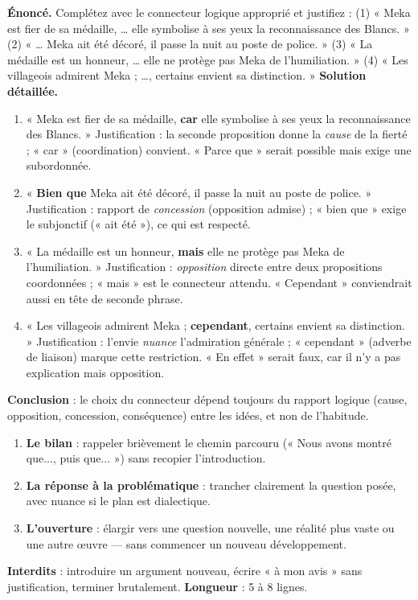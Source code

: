 \documentclass[11pt]{article}
\newcounter{popsec}
\newcounter{popsub}
\newcommand{\courssub}[1]{%
  \stepcounter{popsub}%
  \par\vspace{9pt}\noindent{\popxbold\fontsize{11.5}{13}\selectfont\color{popink}{\color{poporange}\thepopsec.\thepopsub}\hspace{6pt}#1}\par\nopagebreak\vspace{4pt}
}
\begin{document}
\begin{exoresolu}
\textbf{Énoncé.} Complétez avec le connecteur logique approprié et justifiez : (1) « Meka est fier de sa médaille, \dots{} elle symbolise à ses yeux la reconnaissance des Blancs. » (2) « \dots{} Meka ait été décoré, il passe la nuit au poste de police. » (3) « La médaille est un honneur, \dots{} elle ne protège pas Meka de l'humiliation. » (4) « Les villageois admirent Meka ; \dots{}, certains envient sa distinction. »
\tcblower
\textbf{Solution détaillée.}
\begin{enumerate}
\item « Meka est fier de sa médaille, \textbf{car} elle symbolise à ses yeux la reconnaissance des Blancs. » Justification : la seconde proposition donne la \emph{cause} de la fierté ; « car » (coordination) convient. « Parce que » serait possible mais exige une subordonnée.
\item « \textbf{Bien que} Meka ait été décoré, il passe la nuit au poste de police. » Justification : rapport de \emph{concession} (opposition admise) ; « bien que » exige le subjonctif (« ait été »), ce qui est respecté.
\item « La médaille est un honneur, \textbf{mais} elle ne protège pas Meka de l'humiliation. » Justification : \emph{opposition} directe entre deux propositions coordonnées ; « mais » est le connecteur attendu. « Cependant » conviendrait aussi en tête de seconde phrase.
\item « Les villageois admirent Meka ; \textbf{cependant}, certains envient sa distinction. » Justification : l'envie \emph{nuance} l'admiration générale ; « cependant » (adverbe de liaison) marque cette restriction. « En effet » serait faux, car il n'y a pas explication mais opposition.
\end{enumerate}
\textbf{Conclusion} : le choix du connecteur dépend toujours du rapport logique (cause, opposition, concession, conséquence) entre les idées, et non de l'habitude.
\end{exoresolu}

\courssub{Méthode 6 : Rédiger la conclusion}

\begin{methode}
\begin{enumerate}
\item \textbf{Le bilan} : rappeler brièvement le chemin parcouru (« Nous avons montré que..., puis que... ») sans recopier l'introduction.
\item \textbf{La réponse à la problématique} : trancher clairement la question posée, avec nuance si le plan est dialectique.
\item \textbf{L'ouverture} : élargir vers une question nouvelle, une réalité plus vaste ou une autre œuvre — sans commencer un nouveau développement.
\end{enumerate}
\textbf{Interdits} : introduire un argument nouveau, écrire « à mon avis » sans justification, terminer brutalement.
\textbf{Longueur} : 5 à 8 lignes.
\end{methode}
\end{document}
